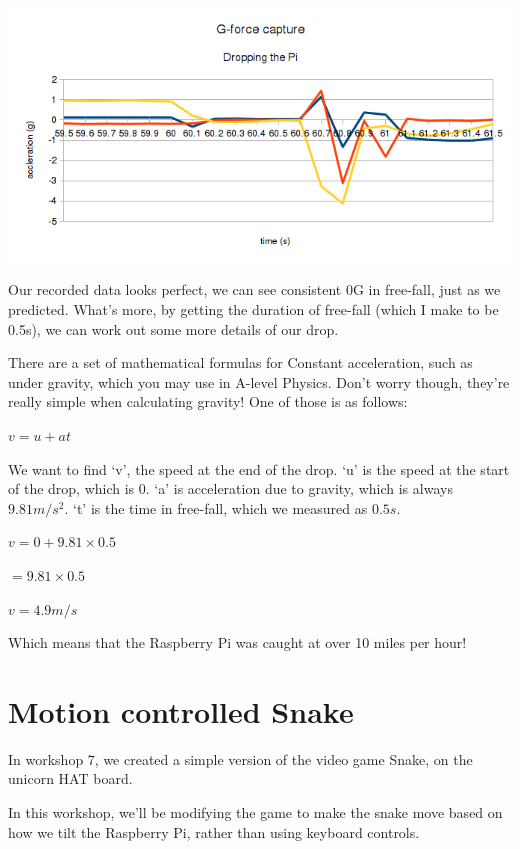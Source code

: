 	\begin{center}
		\includegraphics[width=1\linewidth]{McrRaspJam/008_SenseHAT/img/graph_detail}
	\end{center}
	
	Our recorded data looks perfect, we can see consistent 0G in free-fall, just as we predicted. What's more, by getting the duration of free-fall (which I make to be 0.5s), we can work out some more details of our drop.
	
	There are a set of mathematical formulas for Constant acceleration, such as under gravity, which you may use in A-level Physics. Don't worry though, they're really simple when calculating gravity! One of those is as follows:
	
	$v = u + at$
	
	We want to find `v', the speed at the end of the drop. `u' is the speed at the start of the drop, which is 0. `a' is acceleration due to gravity, which is always $9.81m/s^{2}$. `t' is the time in free-fall, which we measured as $0.5s$.
	
	$v = 0 + 9.81 \times 0.5$
	
	$= 9.81 \times 0.5$
	
	$v = 4.9 m/s$
	
	Which means that the Raspberry Pi was caught at over 10 miles per hour!
	
	\webclearpage
	\ifprint\else
	\section{Motion controlled Snake}
	
	In workshop 7, we created a simple version of the video game Snake, on the unicorn HAT board.
	
	In this workshop, we'll be modifying the game to make the snake move based on how we tilt the Raspberry Pi, rather than using keyboard controls.
	
